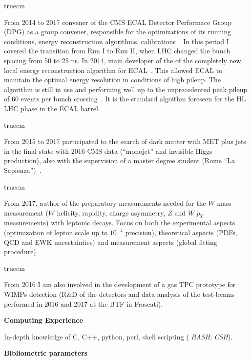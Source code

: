 \documentclass[11pt,twoside,a4paper]{article}
\begin{document}
 truecm

From 2014 to 2017 convener of the CMS ECAL Detector Performace Group
(DPG) as a group convener, responsible for the optimizations of its
running conditions, energy reconstruction algorithms,
calibrations~\cite{photonpaper}. In this period I covered the
transition from Run I to Run II, when LHC changed the bunch spacing
from 50 to 25 ns.  In 2014, main developer of the of the completely
new local energy reconstruction algorithm for
ECAL~\cite{conf_ieee14}. This allowed ECAL to maintain the optimal
energy resolution in conditions of high pileup.  The algorithm is
still in use and performing well up to the unprecedented peak pileup
of 60 events per bunch crossing~\cite{conf_hc16}. It is the standard 
algoithm foreseen for the HL LHC phase in the ECAL barrel.

 truecm

From 2015 to 2017 participated to the search of dark matter with MET
plus jets in the final state with 2016 CMS data (``monojet'' and
invisible Higgs production), also with the supervision of a master
degree student (Rome ``La Sapienza'')~\cite{monojet}.

 truecm

From 2017, author of the preparatory measurements needed for the $W$
mass measurement ($W$ helicity, rapidity, charge asymmetry, $Z$ and
$W$ $p_T$ measurements) with leptonic decays. Focus on both the
experimental aspects (optimization of lepton scale up to $10^{-4}$
precision), theoretical aspects (PDFs, QCD and EWK uncertainties) and
measurement aspects (global fitting procedure).

 truecm

From 2016 I am also involved in the development of a gas TPC prototype
for WIMPs detection (R\&D of the detectors and data analysis of the
test-beams performed in 2016 and 2017 at the BTF in Frascati).


\begin{center}
 { \bf Computing  Experience }
\end{center}

In-depth knowledge of C, C++, python, perl, shell scripting ({\it
  BASH}, {\it CSH}).


 
\newpage

\begin{center}
  {\bf Bibliometric parameters}
\end{center}
\end{document}
